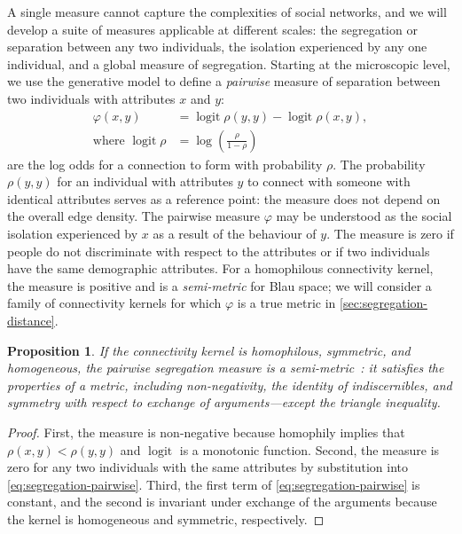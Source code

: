 \documentclass{scrartcl}
\DeclareMathOperator{\logit}{logit}
\newtheorem{prop}{Proposition}
\begin{document}
A single measure cannot capture the complexities of social networks, and we will develop a suite of measures applicable at different scales: the segregation or separation between any two individuals, the isolation experienced by any one individual, and a global measure of segregation. Starting at the microscopic level, we use the generative model to define a \emph{pairwise} measure of separation between two individuals with attributes $x$ and $y$:
\begin{align}
    \varphi(x, y) &= \logit \rho(y,y) - \logit\rho(x,y),\label{eq:segregation-pairwise}\\
    \text{where }\logit\rho &= \log\left(\frac{\rho}{1-\rho}\right)\nonumber
\end{align}
are the log odds for a connection to form with probability $\rho$. The probability $\rho(y, y)$ for an individual with attributes $y$ to connect with someone with identical attributes serves as a reference point: the measure does not depend on the overall edge density. The pairwise measure $\varphi$ may be understood as the social isolation experienced by $x$ as a result of the behaviour of $y$. The measure is zero if people do not discriminate with respect to the attributes or if two individuals have the same demographic attributes.
For a homophilous connectivity kernel, the measure is positive and is a \emph{semi-metric} for Blau space; we will consider a family of connectivity kernels for which $\varphi$ is a true metric in \cref{sec:segregation-distance}.

\begin{prop}\label{prop:segregations-semi-metric}
    If the connectivity kernel is homophilous, symmetric, and homogeneous, the pairwise segregation measure is a \emph{semi-metric}~\cite{Wilson1931}: it satisfies the properties of a metric, including non-negativity, the identity of indiscernibles, and symmetry with respect to exchange of arguments---except the triangle inequality.
\end{prop}
\begin{proof}
    First, the measure is non-negative because homophily implies that $\rho(x, y)<\rho(y, y)$ and $\logit$ is a monotonic function. Second, the measure is zero for any two individuals with the same attributes by substitution into \cref{eq:segregation-pairwise}. Third, the first term of \cref{eq:segregation-pairwise} is constant, and the second is invariant under exchange of the arguments because the kernel is homogeneous and symmetric, respectively.
\end{proof}
\end{document}
